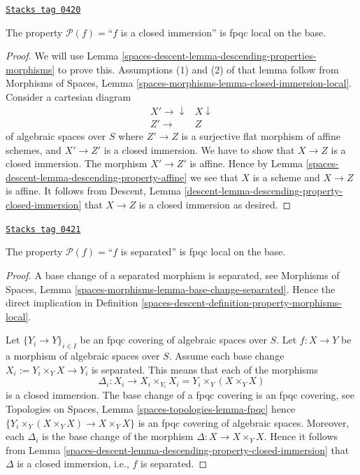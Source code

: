 \begin{lemma}
\label{spaces-descent-lemma-descending-property-closed-immersion}
\href{https://stacks.math.columbia.edu/tag/0420}{\texttt{Stacks tag 0420}}

The property $\mathcal{P}(f) =$``$f$ is a closed immersion''
is fpqc local on the base.
\end{lemma}

\begin{proof}
We will use
Lemma \ref{spaces-descent-lemma-descending-properties-morphisms}
to prove this. Assumptions (1) and (2) of that lemma follow from
Morphisms of Spaces,
Lemma \ref{spaces-morphisms-lemma-closed-immersion-local}.
Consider a cartesian diagram
$$
\begin{array}{cc}X' \longrightarrow\downarrow & X \downarrow \\ Z' \longrightarrow & Z\end{array}
$$
of algebraic spaces over $S$
where $Z' \to Z$ is a surjective flat morphism of affine schemes,
and $X' \to Z'$ is a closed immersion. We have to show that $X \to Z$
is a closed immersion. The morphism $X' \to Z'$ is affine. Hence by
Lemma \ref{spaces-descent-lemma-descending-property-affine}
we see that $X$ is a scheme and $X \to Z$ is affine.
It follows from
Descent, Lemma \ref{descent-lemma-descending-property-closed-immersion}
that $X \to Z$ is a closed immersion as desired.
\end{proof}

\begin{lemma}
\label{spaces-descent-lemma-descending-property-separated}
\href{https://stacks.math.columbia.edu/tag/0421}{\texttt{Stacks tag 0421}}

The property $\mathcal{P}(f) =$``$f$ is separated''
is fpqc local on the base.
\end{lemma}

\begin{proof}
A base change of a separated morphism is separated, see
Morphisms of Spaces,
Lemma \ref{spaces-morphisms-lemma-base-change-separated}.
Hence the direct implication in
Definition \ref{spaces-descent-definition-property-morphisms-local}.

\medskip\noindent
Let $\{Y_i \to Y\}_{i \in I}$ be an fpqc covering of algebraic spaces over $S$.
Let $f : X \to Y$ be a morphism of algebraic spaces over $S$.
Assume each base change $X_i := Y_i \times_Y X \to Y_i$ is separated.
This means that each of the morphisms
$$
\Delta_i :
X_i
\longrightarrow
X_i \times_{Y_i} X_i = Y_i \times_Y (X \times_Y X)
$$
is a closed immersion. The base change of a fpqc covering is an
fpqc covering, see
Topologies on Spaces, Lemma \ref{spaces-topologies-lemma-fpqc}
hence $\{Y_i \times_Y (X \times_Y X) \to X \times_Y X\}$
is an fpqc covering of algebraic spaces. Moreover, each
$\Delta_i$ is the base change of the morphism
$\Delta : X \to X \times_Y X$. Hence it follows from
Lemma \ref{spaces-descent-lemma-descending-property-closed-immersion}
that $\Delta$ is a closed immersion, i.e., $f$ is separated.
\end{proof}

